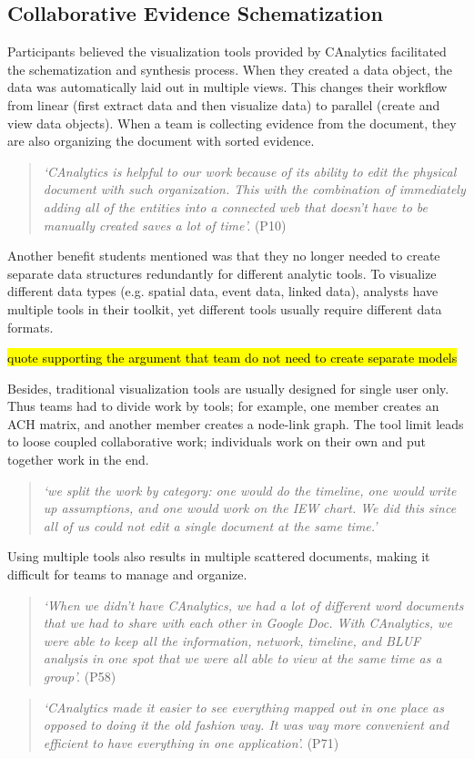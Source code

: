 \subsection{Collaborative Evidence Schematization}

Participants believed the visualization tools provided by CAnalytics facilitated the schematization and synthesis process. When they created a data object, the data was automatically laid out in multiple views. This changes their workflow from linear (first extract data and then visualize data) to parallel (create and view data objects). When a team is collecting evidence from the document, they are also organizing the document with sorted evidence. 

\begin{quote}
	\textit{`CAnalytics is helpful to our work because of its ability to edit the physical document with such organization. This with the combination of immediately adding all of the entities into a connected web that doesn't have to be manually created saves a lot of time'.} (P10)
\end{quote}

Another benefit students mentioned was that they no longer needed to create separate data structures redundantly for different analytic tools. To visualize different data types (e.g. spatial data, event data, linked data), analysts have multiple tools in their toolkit, yet different tools usually require different data formats. 

\hl{quote supporting the argument that team do not need to create separate models}

Besides, traditional visualization tools are usually designed for single user only. Thus teams had to divide work by tools; for example, one member creates an ACH matrix, and another member creates a node-link graph. The tool limit leads to loose coupled collaborative work; individuals work on their own and put together work in the end. 

\begin{quote}
	\textit{`we split the work by category: one would do the timeline, one would write up assumptions, and one would work on the IEW chart. We did this since all of us could not edit a single document at the same time.'}
\end{quote}

Using multiple tools also results in multiple scattered documents, making it difficult for teams to manage and organize.  

\begin{quote}
	\textit{`When we didn't have CAnalytics, we had a lot of different word documents that we had to share with each other in Google Doc. With CAnalytics, we were able to keep all the information, network, timeline, and BLUF analysis in one spot that we were all able to view at the same time as a group'.} (P58)
\end{quote}
\begin{quote}
	\textit{`CAnalytics made it easier to see everything mapped out in one place as opposed to doing it the old fashion way. It was way more convenient and efficient to have everything in one application'.} (P71)
\end{quote}


